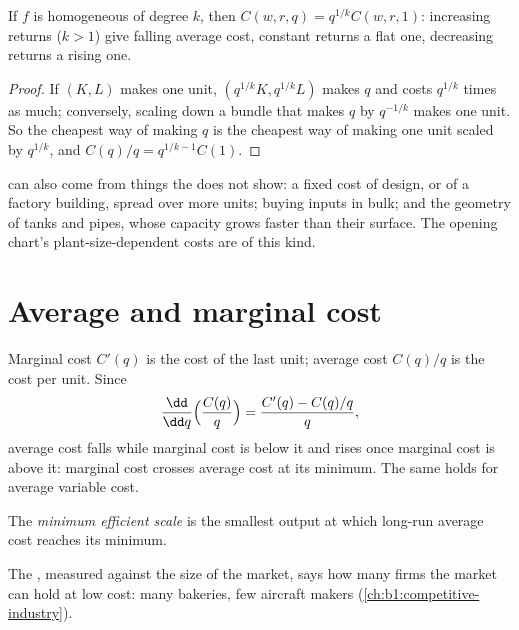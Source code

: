 \begin{proposition}\label{prop:b1:cost-minimisation:scale}
If $f$ is homogeneous of degree $k$, then $C(w, r, q) = q^{1/k}C(w, r, 1)$:
increasing returns ($k > 1$) give falling average cost, constant returns a
flat one, decreasing returns a rising one.
\end{proposition}

\begin{proof}
If $(K, L)$ makes one unit, $(q^{1/k}K, q^{1/k}L)$ makes $q$ and costs $q^{1/k}$
times as much; conversely, scaling down a bundle that makes $q$ by $q^{-1/k}$
makes one unit. So the cheapest way of making $q$ is the cheapest way of
making one unit scaled by $q^{1/k}$, and $C(q)/q = q^{1/k - 1}C(1)$.
\end{proof}

 can also come from things the  does
not show: a fixed cost of design, or of a factory building, spread over more
units; buying inputs in bulk; and the geometry of tanks and pipes, whose
capacity grows faster than their surface. The opening chart's
plant-size-dependent costs are of this kind.

\section{Average and marginal cost}\label{sec:b1:cost-minimisation:marginal}

Marginal cost $C'(q)$ is the cost of the last unit; average cost $C(q)/q$ is
the cost per unit. Since
\[
\frac{\dd}{\dd q}\Bigl(\frac{C(q)}q\Bigr) = \frac{C'(q) - C(q)/q}q,
\]
average cost falls while marginal cost is below it and rises once marginal
cost is above it: marginal cost crosses average cost at its minimum. The
same holds for average variable cost.

\begin{definition}\label{def:b1:cost-minimisation:mes}
The \emph{minimum efficient scale} is the smallest output at which long-run
average cost reaches its minimum.
\end{definition}

The , measured against the size of the market, says
how many firms the market can hold at low cost: many bakeries, few
aircraft makers (\cref{ch:b1:competitive-industry}).

